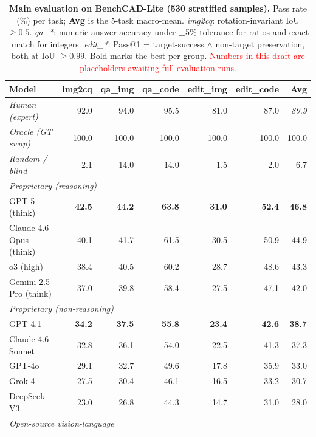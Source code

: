 \documentclass{article}
\begin{document}
\begin{table}[t]
\centering
\small
\setlength{\tabcolsep}{4pt}
\caption{\textbf{Main evaluation on BenchCAD-Lite (530 stratified samples).} Pass rate (\%) per task; \textbf{Avg} is the 5-task macro-mean. \emph{img2cq}: rotation-invariant IoU $\geq 0.5$. \emph{qa\_*}: numeric answer accuracy under $\pm$5\% tolerance for ratios and exact match for integers. \emph{edit\_*}: Pass@1 = target-success $\wedge$ non-target preservation, both at IoU $\geq 0.99$. Bold marks the best per group. \textcolor{red}{Numbers in this draft are placeholders awaiting full evaluation runs.}}
\label{tab:main_eval}
\begin{tabular}{lrrrrrr}
\toprule
Model & img2cq & qa\_img & qa\_code & edit\_img & edit\_code & \textbf{Avg} \\
\midrule
\textit{Human (expert)}      & 92.0 & 94.0 & 95.5 & 81.0 & 87.0 & \textit{89.9} \\
\textit{Oracle (GT swap)}    & 100.0 & 100.0 & 100.0 & 100.0 & 100.0 & 100.0 \\
\textit{Random / blind}      & 2.1 & 14.0 & 14.0 & 1.5 & 2.0 & 6.7 \\
\midrule
\multicolumn{7}{l}{\emph{Proprietary (reasoning)}} \\
GPT-5 (think)                & \textbf{42.5} & \textbf{44.2} & \textbf{63.8} & \textbf{31.0} & \textbf{52.4} & \textbf{46.8} \\
Claude 4.6 Opus (think)      & 40.1 & 41.7 & 61.5 & 30.5 & 50.9 & 44.9 \\
o3 (high)                    & 38.4 & 40.5 & 60.2 & 28.7 & 48.6 & 43.3 \\
Gemini 2.5 Pro (think)       & 37.0 & 39.8 & 58.4 & 27.5 & 47.1 & 42.0 \\
\midrule
\multicolumn{7}{l}{\emph{Proprietary (non-reasoning)}} \\
GPT-4.1                      & \textbf{34.2} & \textbf{37.5} & \textbf{55.8} & \textbf{23.4} & \textbf{42.6} & \textbf{38.7} \\
Claude 4.6 Sonnet            & 32.8 & 36.1 & 54.0 & 22.5 & 41.3 & 37.3 \\
GPT-4o                       & 29.1 & 32.7 & 49.6 & 17.8 & 35.9 & 33.0 \\
Grok-4                       & 27.5 & 30.4 & 46.1 & 16.5 & 33.2 & 30.7 \\
DeepSeek-V3                  & 23.0 & 26.8 & 44.3 & 14.7 & 31.0 & 28.0 \\
\midrule
\multicolumn{7}{l}{\emph{Open-source vision-language}} \\

\end{tabular}
\end{table}
\end{document}
